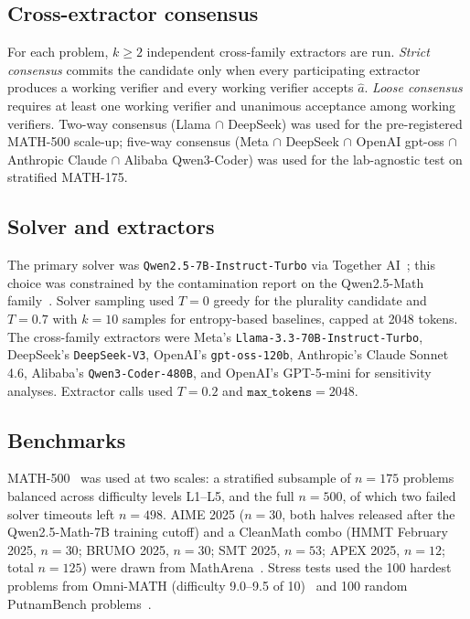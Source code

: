 \documentclass{article}
\begin{document}
\subsection{Cross-extractor consensus}

For each problem, $k\geq 2$ independent cross-family extractors are run. \emph{Strict consensus} commits the candidate only when every participating extractor produces a working verifier and every working verifier accepts $\hat a$. \emph{Loose consensus} requires at least one working verifier and unanimous acceptance among working verifiers. Two-way consensus (Llama $\cap$ DeepSeek) was used for the pre-registered MATH-500 scale-up; five-way consensus (Meta $\cap$ DeepSeek $\cap$ OpenAI gpt-oss $\cap$ Anthropic Claude $\cap$ Alibaba Qwen3-Coder) was used for the lab-agnostic test on stratified MATH-175.

\subsection{Solver and extractors}

The primary solver was \texttt{Qwen2.5-7B-Instruct-Turbo} via Together AI~\citep{yang2024qwen25math}; this choice was constrained by the contamination report on the Qwen2.5-Math family~\citep{wu2025contam}. Solver sampling used $T{=}0$ greedy for the plurality candidate and $T{=}0.7$ with $k{=}10$ samples for entropy-based baselines, capped at 2048 tokens. The cross-family extractors were Meta's \texttt{Llama-3.3-70B-Instruct-Turbo}, DeepSeek's \texttt{DeepSeek-V3}, OpenAI's \texttt{gpt-oss-120b}, Anthropic's Claude Sonnet 4.6, Alibaba's \texttt{Qwen3-Coder-480B}, and OpenAI's GPT-5-mini for sensitivity analyses. Extractor calls used $T{=}0.2$ and $\texttt{max\_tokens}=2048$.

\subsection{Benchmarks}

MATH-500~\citep{hendrycks2021math, lightman2024prm} was used at two scales: a stratified subsample of $n{=}175$ problems balanced across difficulty levels L1--L5, and the full $n{=}500$, of which two failed solver timeouts left $n{=}498$. AIME 2025 ($n{=}30$, both halves released after the Qwen2.5-Math-7B training cutoff) and a CleanMath combo (HMMT February 2025, $n{=}30$; BRUMO 2025, $n{=}30$; SMT 2025, $n{=}53$; APEX 2025, $n{=}12$; total $n{=}125$) were drawn from MathArena~\citep{matharena2025}. Stress tests used the 100 hardest problems from Omni-MATH (difficulty 9.0--9.5 of 10)~\citep{omnimath2024} and 100 random PutnamBench problems~\citep{amitayusht2024putnambench}.
\end{document}
